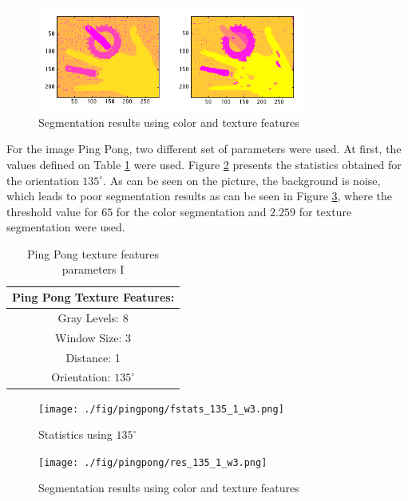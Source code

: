 \documentclass{IEEEtran}
\begin{document}
\begin{figure}[h!] 
 \centering
 \includegraphics[width=250pt]{./fig/hand/res_1_all_w15_end_5.png}%
 \caption{Segmentation results using color and texture features}
 \label{fig:hand_seg}
\end{figure}


For the image Ping Pong, two different set of parameters were used. At first, the values defined on Table \ref{tb:param_pingpong1} were used. Figure \ref{fig:pingpong_135_1} presents the statistics obtained for the orientation $135^{\circ}$. As can be seen on the picture, the background is noise, which leads to poor segmentation results as can be seen in Figure \ref{fig:pingpong_seg_1}, where the threshold value for $65$ for the color segmentation and $2.259$ for texture segmentation were used.


\begin{table}[h!] 
\centering
\begin{tabular}{|c|}
\hline
Ping Pong Texture Features:\\
\hline
  Gray Levels:   8\\
  Window Size: 3\\
  Distance:   1\\
  Orientation:  $135^{\circ}$\\
\hline
\end{tabular}
\caption{Ping Pong texture features parameters I}
\label{tb:param_pingpong1}
\end{table}

\begin{figure}[h!] 
 \centering
 \texttt{[image: ./fig/pingpong/fstats\_135\_1\_w3.png]}%
 \caption{Statistics using $135^{\circ}$}
 \label{fig:pingpong_135_1}
\end{figure}

\begin{figure}[h!] 
 \centering
 \texttt{[image: ./fig/pingpong/res\_135\_1\_w3.png]}%
 \caption{Segmentation results using color and texture features}
 \label{fig:pingpong_seg_1}
\end{figure}
\end{document}

